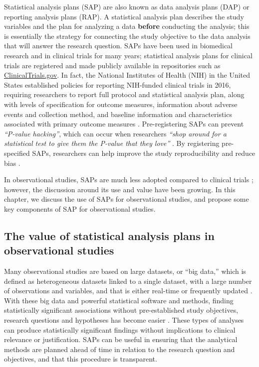 \documentclass[
]{book}
\begin{document}
Statistical analysis plans (SAP) are also known as data analysis plans (DAP) or reporting analysis plans (RAP). A statistical analysis plan describes the study variables and the plan for analyzing a data \textbf{before} conducting the analysis; this is essentially the strategy for connecting the study objective to the data analysis that will answer the research question. SAPs have been used in biomedical research and in clinical trials for many years; statistical analysis plans for clinical trials are registered and made publicly available in repositories such as \href{http://www.clinicaltrials.gov/}{ClinicalTrials.gov}. In fact, the National Institutes of Health (NIH) in the United States established policies for reporting NIH-funded clinical trials in 2016, requiring researchers to report full protocol and statistical analysis plan, along with levels of specification for outcome measures, information about adverse events and collection method, and baseline information and characteristics associated with primary outcome measures \citep{zarin2016trial}. Pre-registering SAPs can prevent \emph{``P-value hacking''}, which can occur when researchers \emph{``shop around for a statistical test to give them the P-value that they love''} \citep{yuan2019guide}. By registering pre-specified SAPs, researchers can help improve the study reproducibility and reduce bias \citep{kahan2020public}.

In observational studies, SAPs are much less adopted compared to clinical trials \citep{thor2020registering}; however, the discussion around its use and value have been growing. In this chapter, we discuss the use of SAPs for observational studies, and propose some key components of SAP for observational studies.

\hypertarget{the-value-of-statistical-analysis-plans-in-observational-studies}{%
\subsection{The value of statistical analysis plans in observational studies}\label{the-value-of-statistical-analysis-plans-in-observational-studies}}

Many observational studies are based on large datasets, or ``big data,'' which is defined as heterogeneous datasets linked to a single dataset, with a large number of observations and variables, and that is either real-time or frequently updated \citep{ehrenstein2017clinical}. With these big data and powerful statistical software and methods, finding statistically significant associations without pre-established study objectives, research questions and hypotheses has become easier \citep{yuan2019guide}. These types of analyses can produce statistically significant findings without implications to clinical relevance or justification. SAPs can be useful in ensuring that the analytical methods are planned ahead of time in relation to the research question and objectives, and that this procedure is transparent.
\end{document}
